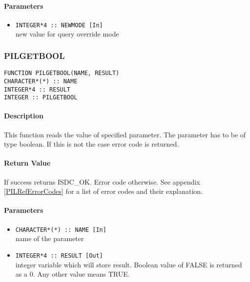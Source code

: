 \paragraph{Parameters}
\begin{itemize}
\item
{\tt INTEGER*4 :: NEWMODE [In] } \\
new value for query override mode 
\end{itemize}



\subsubsection{PILGETBOOL}

\begin{verbatim}
FUNCTION PILGETBOOL(NAME, RESULT) 
CHARACTER*(*) :: NAME 
INTEGER*4 :: RESULT 
INTEGER :: PILGETBOOL 
\end{verbatim}

\paragraph{Description\\}
This function reads the value of specified parameter. The parameter has to
be of type boolean. If this is not the
case error code is returned. 

\paragraph{Return Value\\}
If success returns ISDC\_OK. Error code otherwise. See appendix \ref{PILRefErrorCodes}
for a list of error codes and their explanation.

\paragraph{Parameters}
\begin{itemize}
\item
{\tt CHARACTER*(*) :: NAME [In] } \\
name of the parameter 
\item
{\tt INTEGER*4 :: RESULT [Out] } \\
integer variable which will store result. Boolean value of FALSE is returned
as a 0. Any other value means TRUE. 
\end{itemize}


